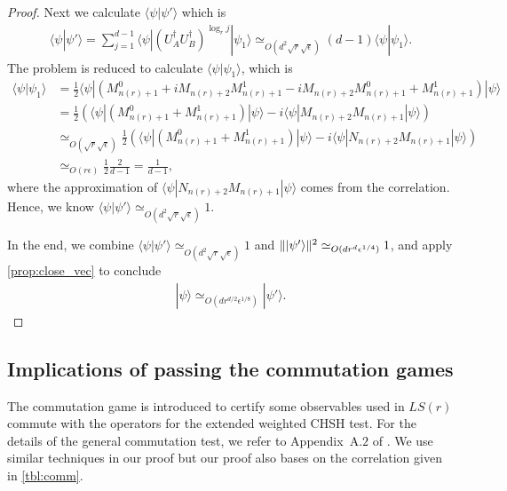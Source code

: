 \documentclass[11pt,letterpaper]{article}
\newcommand{\ket}[1]{|#1\rangle}
\newcommand{\bra}[1]{\langle#1|}
\newcommand{\braket}[2]{\langle#1|#2\rangle}
\newcommand{\ct}{^{\dagger}}
\DeclarePairedDelimiter{\norm}{\lVert}{\rVert}
\newcommand{\1}{\mathbb{1}}
\newcommand{\LS}{LS}
\newcommand{\nr}{n(r)}
\newcommand{\ep}{\epsilon}
\newcommand{\se}{\sqrt{\epsilon}}
\newcommand{\qe}{\epsilon^{1/4}}
\newcommand{\sr}{\sqrt{r}}
\newcommand{\appd}[1]{\simeq_{#1}}
\theoremstyle{definition}
\begin{document}
\begin{proof}
	Next we calculate $\braket{\psi}{\psi'}$ which is
	\begin{align*}
		\braket{\psi}{\psi'} = \sum_{j=1}^{d-1} \bra{\psi} (U_A\ct U_B\ct)^{\log_r j} \ket{\psi_1}
		 \appd{O(d^2\sr\se)} (d-1) \braket{\psi}{\psi_1}.
	\end{align*}
	The problem is reduced to calculate $\braket{\psi}{\psi_1}$, which is
	\begin{align*}
		\braket{\psi}{\psi_1} &= \frac{1}{2} \bra{\psi} (M_{\nr+1}^0 + iM_{\nr+2}M_{\nr+1}^1 - iM_{\nr+2}M_{\nr+1}^0 +M_{\nr+1}^1) \ket{\psi}\\
		& = \frac{1}{2} \left(\bra{\psi}(M_{\nr+1}^0 + M_{\nr+1}^1) \ket{\psi} - i \bra{\psi}M_{\nr+2}M_{\nr+1} \ket{\psi} \right)\\
		& \appd{O(\sr\se)} \frac{1}{2} \left(\bra{\psi}(M_{\nr+1}^0 + M_{\nr+1}^1) \ket{\psi}  - i \bra{\psi}N_{\nr+2}M_{\nr+1} \ket{\psi} \right)\\
		& \appd{O(r \ep)} \frac{1}{2} \frac{2}{d-1} = \frac{1}{d-1},
	\end{align*}
	where the approximation of $\bra{\psi}N_{\nr+2}M_{\nr+1} \ket{\psi}$ comes from the correlation.
	Hence, we know $\braket{\psi}{\psi'} \appd{O(d^2 \sr \se)} 1$.
	
	In the end, we combine $\braket{\psi}{\psi'} \appd{O(d^2 \sr \se)} 1$ and $\norm{\ket{\psi'}}^2 \appd{O(d r^d \qe)} 1$,
	and apply \cref{prop:close_vec} to conclude
	\begin{align*}
		\ket{\psi} \appd{O(d r^{d/2} \ep^{1/8})} \ket{\psi'}.
	\end{align*}
\end{proof}


\subsection{Implications of passing the commutation games}
\label{sec:imp_comm}
The commutation game is introduced to certify some observables used in $\LS(r)$ commute with 
the operators for the extended weighted CHSH test. For the details of the general commutation test, 
we refer to Appendix~A.$2$ of \cite{coladan2017verifier}. 
We use similar techniques in our proof but our proof also bases on the correlation given in \cref{tbl:comm}.
\end{document}

